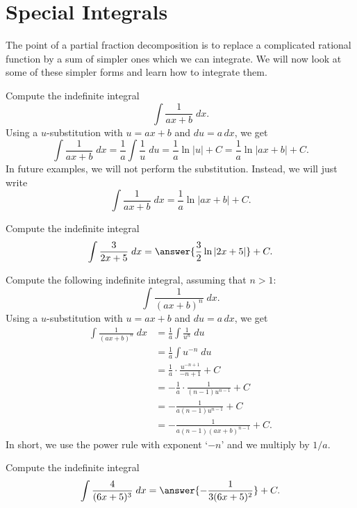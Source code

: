 \documentclass{ximera}
\begin{document}
\section{Special Integrals}
The point of a partial fraction decomposition is to replace a complicated rational function by a sum of simpler ones which we can integrate.
We will now look at some of these simpler forms and learn how to integrate them.

\begin{example}[example 2]
Compute the indefinite integral
\[
\int \frac{1}{ax+b} \; dx.
\]
Using a $u$-substitution with $u = ax+b$ and $du = a \, dx$,
we get
\[
\int \frac{1}{ax+b} \; dx = \frac{1}{a} \int \frac{1}{u} \; du = \frac{1}{a} \ln|u| + C = \frac{1}{a} \ln|ax+b| + C.
\]
In future examples, we will not perform the substitution.  Instead, we will just write
\[
\int \frac{1}{ax+b} \; dx = \frac{1}{a} \ln|ax+b| + C.
\]
\end{example}

\begin{problem}
Compute the indefinite integral
\[
\int \frac{3}{2x+5} \; dx = \answer{\frac32 \ln|2x+5|} + C.
\]
\end{problem}

\begin{example}
Compute the following indefinite integral, assuming that $n > 1$:
\[
\int \frac{1}{(ax+b)^n} \; dx.
\]
Using a $u$-substitution with $u = ax+b$ and $du = a \, dx$,
we get
\begin{align*}
\int \frac{1}{(ax+b)^n} \; dx &= \frac{1}{a} \int \frac{1}{u^n} \; du \\
                              &= \frac{1}{a} \int u^{-n} \; du \\
                              &= \frac{1}{a} \cdot \frac{u^{-n+1}}{-n+1} + C \\
                              &= -\frac{1}{a} \cdot \frac{1}{(n-1)u^{n-1}} + C\\
                              &= -\frac{1}{a(n-1)u^{n-1}} + C\\
                              &= -\frac{1}{a(n-1)(ax+b)^{n-1}} + C.
\end{align*}
In short, we use the power rule with exponent `$-n$' and we multiply by $1/a$.
\end{example}

\begin{problem}
Compute the indefinite integral
\[
\int \frac{4}{(6x+ 5)^3} \; dx = \answer{-\frac{1}{3(6x+5)^2}} + C.
\]

\end{problem}
\end{document}
